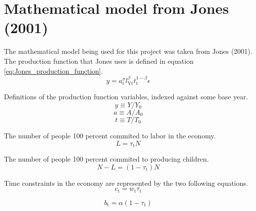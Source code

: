\documentclass[letterpaper,12pt]{article}
\begin{document}

\section{Mathematical model from Jones (2001)}

The mathematical model being used for this project was taken from Jones (2001). The production function that Jones uses is defined in equation \ref{eq:Jones_production_function}.
\begin{equation} \label{eq:Jones_production_function}
y = a_\mathrm{t} ^\sigma l_\mathrm{Yt} ^\beta t_\mathrm{t} ^{1-\beta} \epsilon
\end{equation}

Definitions of the production function variables, indexed against some base year.
\begin{equation} \label{eq:index_y}
	y \equiv Y/Y_\mathrm{0}
\end{equation}
\begin{equation} \label{eq:index_a}
	a \equiv A/A_\mathrm{0}
\end{equation}
\begin{equation} \label{eq:index_t}
	t \equiv T/T_\mathrm{0}
\end{equation}

The number of people 100 percent commited to labor in the economy.
\begin{equation}\label{eq:pop_work}
	L = \tau_\mathrm{t} N
\end{equation}

The number of people 100 percent commited to producing children.
\begin{equation} \label{eq:pop_birth}
	N-L = (1-\tau_\mathrm{t})N
\end{equation}

Time constraints in the economy are represented by the two following equations.
\begin{equation} \label{eq:consumption}
	c_\mathrm{t} = w_\mathrm{t} \tau_\mathrm{t}
\end{equation}

\begin{equation} \label{eq:birth}
	b_\mathrm{t} = \alpha (1-\tau_\mathrm{t})
\end{equation}
\end{document}
